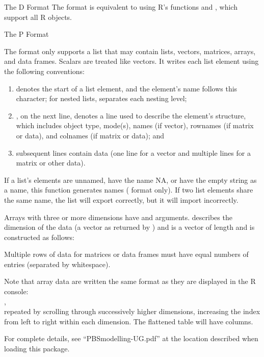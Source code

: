 \documentclass[letterpaper]{book}
\begin{document}
\begin{Details}\relax
%
\begin{SubSection}{The D Format}
The  format is equivalent to using R's  functions 
 and , which support all R objects.

\end{SubSection}


%
\begin{SubSection}{The P Format}
    
The  format only supports a list that may contain lists,
vectors, matrices, arrays, and data frames.  Scalars are treated
like vectors. It writes each list element using the following
conventions:
\begin{enumerate}

\item \code{\$} denotes the start of a list element, and the element's
name follows this character; for nested lists, \code{\$} separates
each nesting level;
\item \code{\$\$}, on the next line, denotes a line used to describe
the element's structure, which includes object type, mode(s), names
(if vector), rownames (if matrix or data), and colnames (if matrix
or data); and
\item subsequent lines contain data (one line for a vector and
multiple lines for a matrix or other data).

\end{enumerate}

If a list's elements are unnamed, have the name NA, or have the
empty string as a name, this function generates names (
format only). If two list elements share the same name, the list
will export correctly, but it will import incorrectly.

Arrays with three or more dimensions have  and
 arguments.  describes the dimension of the
data (a vector as returned by ) and
 is a vector of length 
and is constructed as follows:


Multiple rows of data for matrices or data frames must have equal 
numbers of entries (separated by whitespace).

Note that array data are written the same format as they are
displayed in the R console: \\{}
,  \\{}
repeated by scrolling through successively higher dimensions, increasing the 
index from left to right within each dimension. The flattened table will have 
 columns.

\end{SubSection}


For complete details, see ``PBSmodelling-UG.pdf'' at the location
described when loading this package.
\end{Details}
\end{document}
